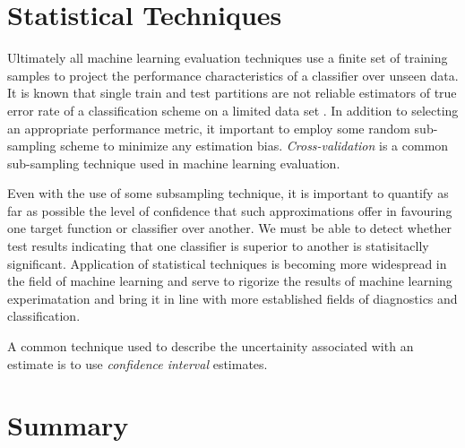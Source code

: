 \documentclass[10pt]{unbthesis}
\begin{document}
\section*{Statistical Techniques}
Ultimately all machine learning evaluation techniques use a finite set
of training samples to project the performance characteristics of
a classifier over unseen data. It is known that single train and
test partitions are not reliable estimators of true error rate of a
classification scheme on a limited data set \cite{RefWorks:57}. In
addition to selecting an appropriate performance metric, it important
to employ some random sub-sampling scheme to minimize any estimation
bias. \textit{Cross-validation} is a common sub-sampling technique used in machine
learning evaluation. 

Even with the use of some subsampling technique, it is important to
quantify as far as possible the level of confidence that such
approximations offer in favouring one target function or classifier
over another.  We must be able to detect whether test results
indicating that one classifier is superior to another is statisitaclly
significant. Application of statistical techniques is becoming more
widespread in the field of machine learning and serve to rigorize the results of machine learning
experimatation and bring it in line with more established fields of
diagnostics and classification.

A common technique used to describe the uncertainity associated with
an estimate is to use \textit{confidence interval} estimates.




\section*{Summary}


\renewcommand{\bibname}{References}



\end{document}
